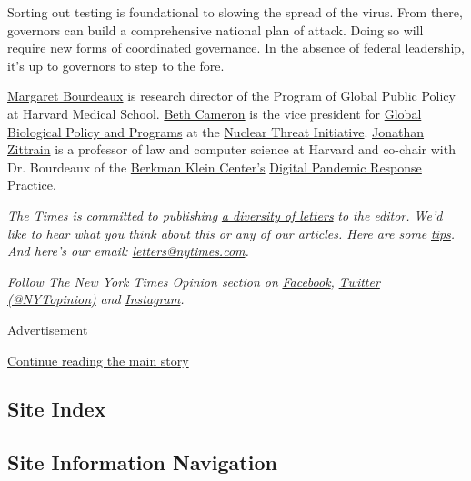 Sorting out testing is foundational to slowing the spread of the virus.
From there, governors can build a comprehensive national plan of attack.
Doing so will require new forms of coordinated governance. In the
absence of federal leadership, it's up to governors to step to the fore.

\href{https://www.hks.harvard.edu/about/margaret-bourdeaux}{Margaret
Bourdeaux} is research director of the Program of Global Public Policy
at Harvard Medical School.
\href{https://www.nti.org/about/leadership-and-staff/beth-cameron/}{Beth
Cameron} is the vice president for \href{http://covid-local.org/}{Global
Biological Policy and Programs} at the \href{http://nti.org/}{Nuclear
Threat Initiative}. \href{https://twitter.com/zittrain}{Jonathan
Zittrain} is a professor of law and computer science at Harvard and
co-chair with Dr. Bourdeaux of the
\href{https://cyber.harvard.edu/}{Berkman Klein Center's}
\href{https://cyber.harvard.edu/programs/bkc-policy-practice-digital-pandemic-response}{Digital
Pandemic Response Practice}.

\emph{The Times is committed to publishing}
\href{https://www.nytimes.com/2019/01/31/opinion/letters/letters-to-editor-new-york-times-women.html}{\emph{a
diversity of letters}} \emph{to the editor. We'd like to hear what you
think about this or any of our articles. Here are some}
\href{https://help.nytimes.com/hc/en-us/articles/115014925288-How-to-submit-a-letter-to-the-editor}{\emph{tips}}\emph{.
And here's our email:}
\href{mailto:letters@nytimes.com}{\emph{letters@nytimes.com}}\emph{.}

\emph{Follow The New York Times Opinion section on}
\href{https://www.facebook.com/nytopinion}{\emph{Facebook}}\emph{,}
\href{http://twitter.com/NYTOpinion}{\emph{Twitter (@NYTopinion)}}
\emph{and}
\href{https://www.instagram.com/nytopinion/}{\emph{Instagram}}\emph{.}

Advertisement

\protect\hyperlink{after-bottom}{Continue reading the main story}

\hypertarget{site-index}{%
\subsection{Site Index}\label{site-index}}

\hypertarget{site-information-navigation}{%
\subsection{Site Information
Navigation}\label{site-information-navigation}}

